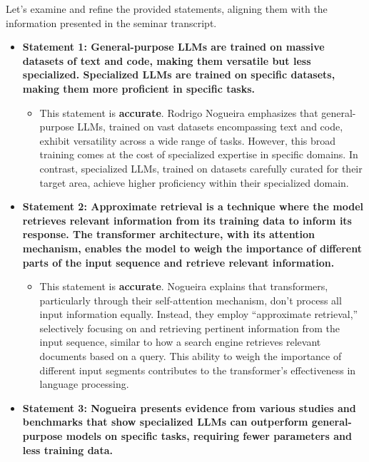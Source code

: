 \documentclass[
]{article}
\author{}
\date{}
\begin{document}
Let's examine and refine the provided statements, aligning them with the
information presented in the seminar transcript.

\begin{itemize}
\item
  \textbf{Statement 1: General-purpose LLMs are trained on massive
  datasets of text and code, making them versatile but less specialized.
  Specialized LLMs are trained on specific datasets, making them more
  proficient in specific tasks.}

  \begin{itemize}
  
  \item
    This statement is \textbf{accurate}. Rodrigo Nogueira emphasizes
    that general-purpose LLMs, trained on vast datasets encompassing
    text and code, exhibit versatility across a wide range of tasks.
    However, this broad training comes at the cost of specialized
    expertise in specific domains. In contrast, specialized LLMs,
    trained on datasets carefully curated for their target area, achieve
    higher proficiency within their specialized domain.
  \end{itemize}
\item
  \textbf{Statement 2: Approximate retrieval is a technique where the
  model retrieves relevant information from its training data to inform
  its response. The transformer architecture, with its attention
  mechanism, enables the model to weigh the importance of different
  parts of the input sequence and retrieve relevant information.}

  \begin{itemize}
  
  \item
    This statement is \textbf{accurate}. Nogueira explains that
    transformers, particularly through their self-attention mechanism,
    don't process all input information equally. Instead, they employ
    ``approximate retrieval,'' selectively focusing on and retrieving
    pertinent information from the input sequence, similar to how a
    search engine retrieves relevant documents based on a query. This
    ability to weigh the importance of different input segments
    contributes to the transformer's effectiveness in language
    processing.
  \end{itemize}
\item
  \textbf{Statement 3: Nogueira presents evidence from various studies
  and benchmarks that show specialized LLMs can outperform
  general-purpose models on specific tasks, requiring fewer parameters
  and less training data.}


\end{itemize}
\end{document}
